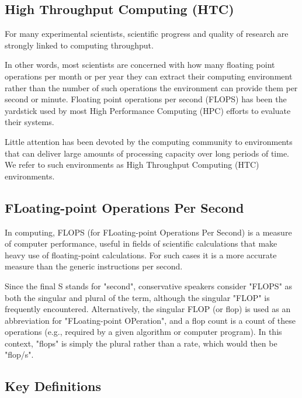 \subsection*{High Throughput Computing (HTC)}
For many experimental scientists, scientific progress and quality of research are strongly linked to computing throughput. 

In other words, most scientists are concerned with how many floating point operations per month or per year they can extract 
their computing environment rather than the number of such operations the environment can provide them per second or minute. 
Floating point operations per second (FLOPS) has been the yardstick used by most High Performance Computing (HPC) efforts to 
evaluate their systems. 

Little attention has been devoted by the computing community to environments that can deliver large 
amounts of processing capacity over long periods of time. We refer to such environments as High Throughput Computing (HTC) 
environments.

\subsection*{FLoating-point Operations Per Second}
In computing, FLOPS (for FLoating-point Operations Per Second) is a measure of computer performance, useful in fields of scientific calculations that make heavy use of floating-point calculations. For such cases it is a more accurate measure than the generic instructions per second.
 
Since the final S stands for "second", conservative speakers consider "FLOPS" as both the singular and plural of the term, although the singular "FLOP" is frequently encountered. Alternatively, the singular FLOP (or flop) is used as an abbreviation for "FLoating-point OPeration", and a flop count is a count of these operations (e.g., required by a given algorithm or computer program). In this context, "flops" is simply the plural rather than a rate, which would then be "flop/s". 

\subsection{Key Definitions}


